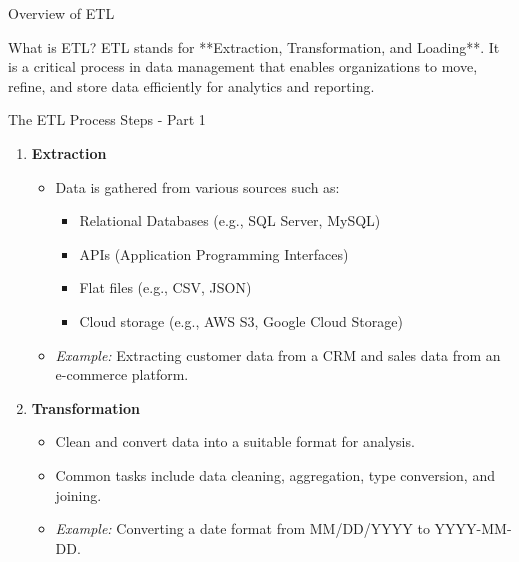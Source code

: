 \documentclass[aspectratio=169]{beamer}
\begin{document}
\begin{frame}{Overview of ETL}
    \begin{block}{What is ETL?}
        ETL stands for **Extraction, Transformation, and Loading**. 
        It is a critical process in data management that enables organizations to move, refine, and store data efficiently for analytics and reporting.
    \end{block}
\end{frame}

\begin{frame}{The ETL Process Steps - Part 1}
    \begin{enumerate}
        \item \textbf{Extraction}
        \begin{itemize}
            \item Data is gathered from various sources such as:
            \begin{itemize}
                \item Relational Databases (e.g., SQL Server, MySQL)
                \item APIs (Application Programming Interfaces)
                \item Flat files (e.g., CSV, JSON)
                \item Cloud storage (e.g., AWS S3, Google Cloud Storage)
            \end{itemize}
            \item \textit{Example:} Extracting customer data from a CRM and sales data from an e-commerce platform.
        \end{itemize}

        \item \textbf{Transformation}
        \begin{itemize}
            \item Clean and convert data into a suitable format for analysis.
            \item Common tasks include data cleaning, aggregation, type conversion, and joining.
            \item \textit{Example:} Converting a date format from MM/DD/YYYY to YYYY-MM-DD.
        \end{itemize}
    \end{enumerate}
\end{frame}
\end{document}
